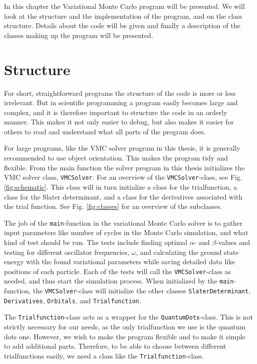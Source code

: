 In this chapter the Variational Monte Carlo program will be
presented. We will look at the structure and the implementation of the
program, and on the class structure. Details about the code will be
given and finally a description of the classes making up the program
will be presented.


\section{Structure} \label{sec:Structure}

	For short, straightforward programs the structure of the code is more or less irrelevant. But in scientific programming a program easily becomes large and complex, and it is therefore important to structure the code in an orderly manner. This makes it not only easier to debug, but also makes it easier for others to read and understand what all parts of the program does. 

	For large programs, like the VMC solver program in this thesis, it is generally recommended to use object orientation. This makes the program tidy and flexible. From the main function the solver program in this thesis initializes the VMC solver class, {\tt VMCSolver}. For an overview of the {\tt VMCSolver}-class, see Fig. \ref{fig:schematic}. This class will in turn initialize a class for the trialfunction, a class for the Slater determinant, and a class for the derivatives associated with the trial function. See Fig. \ref{fig:classes} for an overview of the subclasses.

	The job of the {\tt main}-function in the variational Monte Carlo solver is to gather input parameters like number of cycles in the Monte Carlo simulation, and what kind of test should be run. The tests include finding optimal $\alpha$- and $\beta$-values and testing for different oscillator frequencies, $\omega$, and calculating the ground state energy with the found variational parameters while saving detailed data like positions of each particle. Each of the tests will call the {\tt VMCSolver}-class as needed, and thus start the simulation process. When initialized by the {\tt main}-function, the {\tt VMCSolver}-class will initialize the other classes {\tt SlaterDeterminant}, {\tt Derivatives}, {\tt Orbitals}, and {\tt Trialfunction}. 

	The {\tt Trialfunction}-class acts as a wrapper for the {\tt QuantumDots}-class. This is not strictly necessary for our needs, as the only trialfunction we use is the quantum dots one. However, we wish to make the program flexible and to make it simple to add additional parts. Therefore, to be able to choose between different trialfunctions easily, we need a class like the {\tt Trialfunction}-class. 

